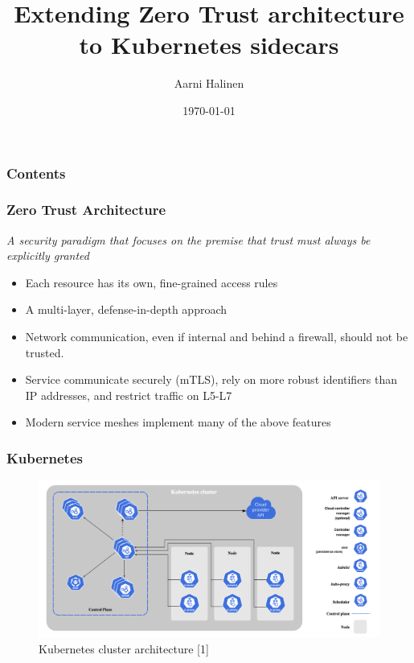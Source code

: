 \documentclass{beamer}
\title{Extending Zero Trust architecture to Kubernetes sidecars}
\author{Aarni Halinen}
\institute{
  Department of Computer Science\\
  Aalto University
}
\date{\today}
\begin{document}

\begin{frame}
\frametitle{Contents}
\end{frame}

\begin{frame}
\frametitle[ZTA]{Zero Trust Architecture}

\emph{A security paradigm that focuses on the premise that trust must always be explicitly granted}

\begin{itemize}
  \item Each resource has its own, fine-grained access rules
  \item A multi-layer, defense-in-depth approach
  \item Network communication, even if internal and behind a firewall, should not be trusted.
  \item Service communicate securely (mTLS), rely on more robust identifiers than IP addresses, and restrict traffic on L5-L7
  \item Modern service meshes implement many of the above features
\end{itemize}
\end{frame}

\begin{frame}
\frametitle{Kubernetes}

\begin{figure}[h!]
  \centering
  \includegraphics[width=\linewidth]{../thesis/files/k8s-arch.png}
  \caption{Kubernetes cluster architecture [1]}
\end{figure}

\end{frame}
\end{document}
